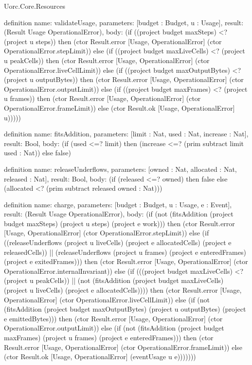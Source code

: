 \begin{lexlean}{Uorc.Core.Resources}
\begin{semanticmodule}
definition{
  name: validateUsage,
  parameters: [budget : Budget, u : Usage],
  result: (Result Usage OperationalError),
  body: (if ((project budget maxSteps) <? (project u steps)) then (ctor Result.error [Usage, OperationalError] (ctor OperationalError.stepLimit)) else (if ((project budget maxLiveCells) <? (project u peakCells)) then (ctor Result.error [Usage, OperationalError] (ctor OperationalError.liveCellLimit)) else (if ((project budget maxOutputBytes) <? (project u outputBytes)) then (ctor Result.error [Usage, OperationalError] (ctor OperationalError.outputLimit)) else (if ((project budget maxFrames) <? (project u frames)) then (ctor Result.error [Usage, OperationalError] (ctor OperationalError.frameLimit)) else (ctor Result.ok [Usage, OperationalError] u)))))
}

definition{
  name: fitsAddition,
  parameters: [limit : Nat, used : Nat, increase : Nat],
  result: Bool,
  body: (if (used <=? limit) then (increase <=? (prim subtract limit used : Nat)) else false)
}

definition{
  name: releaseUnderflows,
  parameters: [owned : Nat, allocated : Nat, released : Nat],
  result: Bool,
  body: (if (released <=? owned) then false else (allocated <? (prim subtract released owned : Nat)))
}

definition{
  name: charge,
  parameters: [budget : Budget, u : Usage, e : Event],
  result: (Result Usage OperationalError),
  body: (if (not (fitsAddition (project budget maxSteps) (project u steps) (project e work))) then (ctor Result.error [Usage, OperationalError] (ctor OperationalError.stepLimit)) else (if ((releaseUnderflows (project u liveCells) (project e allocatedCells) (project e releasedCells)) || (releaseUnderflows (project u frames) (project e enteredFrames) (project e exitedFrames))) then (ctor Result.error [Usage, OperationalError] (ctor OperationalError.internalInvariant)) else (if (((project budget maxLiveCells) <? (project u peakCells)) || (not (fitsAddition (project budget maxLiveCells) (project u liveCells) (project e allocatedCells)))) then (ctor Result.error [Usage, OperationalError] (ctor OperationalError.liveCellLimit)) else (if (not (fitsAddition (project budget maxOutputBytes) (project u outputBytes) (project e emittedBytes))) then (ctor Result.error [Usage, OperationalError] (ctor OperationalError.outputLimit)) else (if (not (fitsAddition (project budget maxFrames) (project u frames) (project e enteredFrames))) then (ctor Result.error [Usage, OperationalError] (ctor OperationalError.frameLimit)) else (ctor Result.ok [Usage, OperationalError] (eventUsage u e)))))))
}


\end{semanticmodule}
\end{lexlean}
